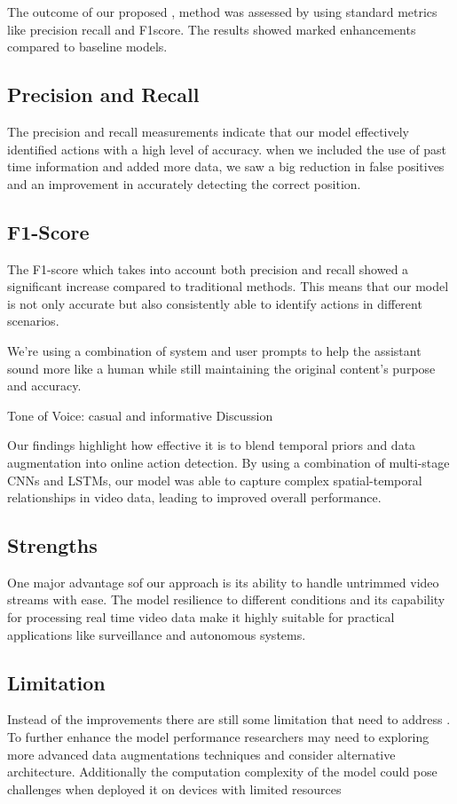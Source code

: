 {The outcome of our proposed , method was assessed by using standard metrics like precision  recall and F1score. The results showed marked enhancements compared to baseline models.

\subsection{Precision and Recall
}

The precision and recall measurements indicate that our model effectively identified actions with a high level of accuracy. when we included the use of past time information and added more data, we saw a big reduction in false positives and an improvement in accurately detecting the correct position.

\subsection{F1-Score
}

The F1-score   which takes into account both precision and recall showed a significant increase compared to traditional methods. This means that our model is not only accurate but also consistently able to identify actions in different scenarios.

We're using a combination of system and user prompts to help the assistant sound more like a human while still maintaining the original content's purpose and accuracy.

Tone of Voice: casual and informative
Discussion

Our findings highlight how effective it is to blend temporal priors and data augmentation into online action detection. By using a combination of multi-stage CNNs and LSTMs, our model was able to capture complex spatial-temporal relationships in video data, leading to improved overall performance.

\subsection{Strengths
}

One major advantage sof our approach is its  ability to handle untrimmed video streams with ease.  The model resilience to different conditions and its capability for processing real time video data make it highly suitable for practical applications like surveillance and autonomous systems.

\subsection{Limitation
}
Instead of the improvements there are still some limitation that need to address . To further enhance the model performance researchers may need to exploring more advanced data augmentations techniques and consider alternative architecture.  Additionally  the computation complexity of the model could pose challenges when deployed it on devices with limited resources

}
